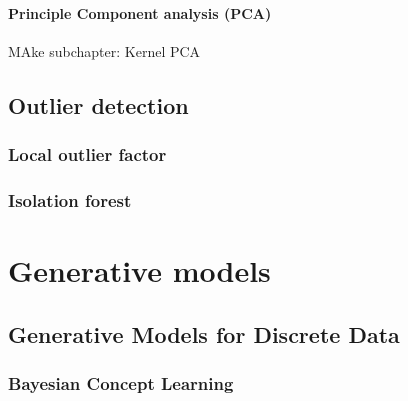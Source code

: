 \documentclass[
]{book}
\begin{document}
\hypertarget{principle-component-analysis-pca}{%
\subsubsection{Principle Component analysis (PCA)}\label{principle-component-analysis-pca}}

MAke subchapter: Kernel PCA

\hypertarget{outlier-detection}{%
\section{Outlier detection}\label{outlier-detection}}

\hypertarget{local-outlier-factor}{%
\subsection{Local outlier factor}\label{local-outlier-factor}}

\hypertarget{isolation-forest}{%
\subsection{Isolation forest}\label{isolation-forest}}

\hypertarget{generative-models}{%
\chapter{Generative models}\label{generative-models}}

\hypertarget{generative-models-for-discrete-data}{%
\section{Generative Models for Discrete Data}\label{generative-models-for-discrete-data}}

\hypertarget{bayesian-concept-learning}{%
\subsection{Bayesian Concept Learning}\label{bayesian-concept-learning}}
\end{document}
